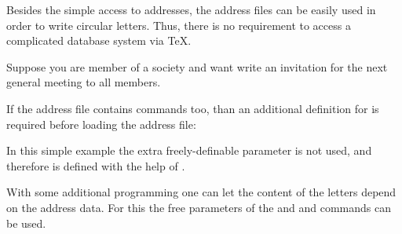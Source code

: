 Besides the simple access to addresses, the address files can be
easily used in order to write circular letters.  Thus, there is no
requirement to access a complicated database system via {\TeX}.
%
\begin{Example}
  Suppose you are member of a society and want write an invitation for
  the next general meeting to all members.
  If the address file contains  commands too, than an
  additional definition for  is required before loading
  the address file:
\begin{lstcode}
  \renewcommand*{\addrentry}[9]{%
    \adrentry{#1}{#2}{#3}{#4}{#5}{#6}{#7}{#9}%
  }
\end{lstcode}
  In this simple example the extra freely-definable parameter is not
  used, and therefore  is defined with the help of
  .
\end{Example}

With some additional programming one can let the content of the
letters depend on the address data. For this the free parameters of
the  and and  commands can be used.

